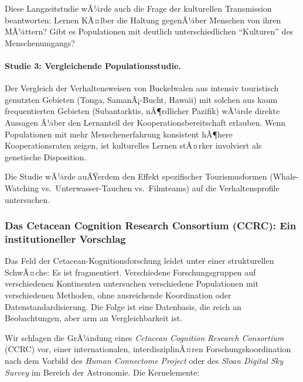 ﻿\documentclass[12pt,a4paper]{article}
\theoremstyle{definition}
\theoremstyle{remark}
\begin{document}
Diese Langzeitstudie wÃ¼rde auch die Frage der kulturellen Transmission beantworten: Lernen KÃ¤lber die Haltung gegenÃ¼ber Menschen von ihren MÃ¼ttern? Gibt es Populationen mit deutlich unterschiedlichen ``Kulturen'' des Menschenumgangs?

\paragraph{Studie 3: Vergleichende Populationsstudie.}
Der Vergleich der Verhaltensweisen von Buckelwalen aus intensiv touristisch genutzten Gebieten (Tonga, SamanÃ¡-Bucht, Hawaii) mit solchen aus kaum frequentierten Gebieten (Subantarktis, nÃ¶rdlicher Pazifik) wÃ¼rde direkte Aussagen Ã¼ber den Lernanteil der Kooperationsbereitschaft erlauben. Wenn Populationen mit mehr Menschenerfahrung konsistent hÃ¶here Kooperationsraten zeigen, ist kulturelles Lernen stÃ¤rker involviert als genetische Disposition.

Die Studie wÃ¼rde auÃŸerdem den Effekt spezifischer Tourismusformen (Whale-Watching vs.\ Unterwasser-Tauchen vs.\ Filmteams) auf die Verhaltensprofile untersuchen.

\subsubsection{Das Cetacean Cognition Research Consortium (CCRC): Ein institutioneller Vorschlag}

Das Feld der Cetacean-Kognitionsforschung leidet unter einer strukturellen SchwÃ¤che: Es ist fragmentiert. Verschiedene Forschungsgruppen auf verschiedenen Kontinenten untersuchen verschiedene Populationen mit verschiedenen Methoden, ohne ausreichende Koordination oder Datenstandardisierung. Die Folge ist eine Datenbasis, die reich an Beobachtungen, aber arm an Vergleichbarkeit ist.

Wir schlagen die GrÃ¼ndung eines \emph{Cetacean Cognition Research Consortium} (CCRC) vor, einer internationalen, interdisziplinÃ¤ren Forschungskoordination nach dem Vorbild des \emph{Human Connectome Project} oder des \emph{Sloan Digital Sky Survey} im Bereich der Astronomie. Die Kernelemente:
\end{document}
